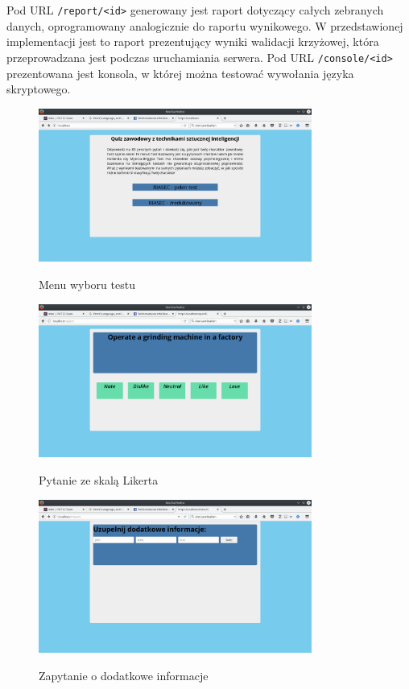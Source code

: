 \documentclass[12pt,a4paper,oneside]{report} %
\begin{document}
Pod URL \texttt{/report/<id>} generowany jest raport dotyczący całych zebranych danych, oprogramowany analogicznie do raportu wynikowego. W przedstawionej implementacji jest to raport prezentujący wyniki walidacji krzyżowej, która przeprowadzana jest podczas uruchamiania serwera. Pod URL \texttt{/console/<id>} prezentowana jest konsola, w której można testować wywołania języka skryptowego.\par

\begin{figure}
\centering
\includegraphics[width=0.8\textwidth]{4.png}
\label{main-menu}
\caption{Menu wyboru testu}
\end{figure}

\begin{figure}
\centering
\includegraphics[width=0.8\textwidth]{2.png}
\label{questions}
\caption{Pytanie ze skalą Likerta}
\end{figure}

\begin{figure}
\centering
\includegraphics[width=0.8\textwidth]{3.png}
\label{additional-info}
\caption{Zapytanie o dodatkowe informacje}
\end{figure}
\end{document}
